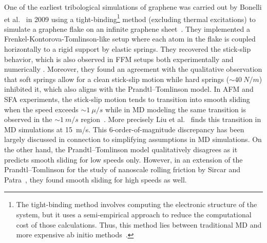 One of the earliest tribological simulations of graphene was carried out by
Bonelli et al.~\cite{bonelli_atomistic_2009} in 2009 using a tight-binding\footnote{The tight-binding method involves computing the electronic structure of the system, but it uses a semi-empirical approach to reduce the computational cost of those calculations. Thus, this method lies between traditional \acrshort{MD} and more expensive ab initio methods~\cite{colombo_tight-binding_2005}.} method (excluding thermal excitations) to simulate a graphene flake on an
infinite graphene sheet~\cite{penkov_tribology_2014}. They implemented a
Frenkel-Kontorova-Tomlinson-like setup where each atom in the flake is coupled horizontally
to a rigid support by elastic springs. They recovered the stick-slip behavior,
which is also observed in \acrshort{FFM} setups both experimentally
\cite{zhao_thermally_2007, zhang_tuning_2019} and numerically
\cite{li_evolving_2016, zhu_study_2018}. Moreover, they found an agreement with
the qualitative observation that soft springs allow for a clean stick-slip
motion while hard springs ($\sim \SI{40}{N/m}$) inhibited it, which also aligns
with the Prandtl–Tomlinson model. In \acrshort{AFM} and \acrshort{SFA} experiments,
the stick-slip motion tends to transition into smooth sliding when the speed
exceeds $\sim \SI{1}{\mu/s}$ while in \acrshort{MD} modeling the same transition
is observed in the $\sim \SI{1}{m/s}$ region~\cite{Manini_2016}. More precisely
Liu et al.~\cite{liu_high-speed_2014} finds this transition in \acrshort{MD}
simulations at \SI{15}{m/s}. This 6-order-of-magnitude discrepancy has been
largely discussed in connection to simplifying assumptions in \acrshort{MD}
simulations. On the other hand, the Prandtl–Tomlinson model qualitatively disagrees
as it predicts smooth sliding for low speeds only.
However, in an extension of the Prandtl–Tomlinson for the study of nanoscale rolling friction by Sircar and Patra~\cite{Sircar_2020}, they found smooth sliding for high speeds as well.


